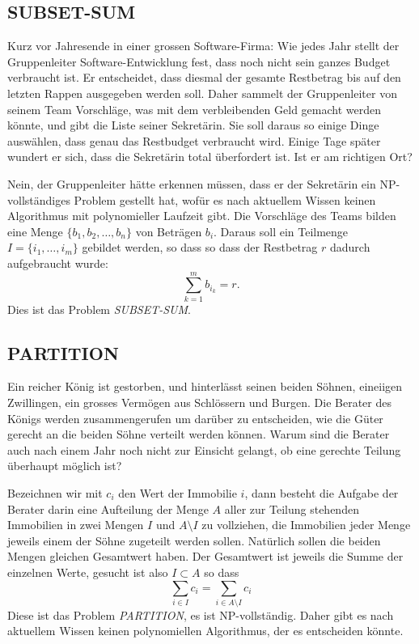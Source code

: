 \subsection{SUBSET-SUM}
Kurz vor Jahresende in einer grossen Software-Firma: Wie jedes Jahr stellt
der Gruppenleiter Software-Entwicklung fest, dass noch nicht sein ganzes
Budget verbraucht ist.  Er entscheidet, dass diesmal der gesamte Restbetrag
bis auf den letzten Rappen
ausgegeben werden soll.  Daher sammelt der Gruppenleiter von seinem
Team Vorschläge, was mit dem verbleibenden Geld gemacht werden könnte,
und gibt die Liste seiner Sekretärin.  Sie soll daraus so einige Dinge
auswählen, dass genau das Restbudget verbraucht wird. Einige Tage später
wundert er sich, dass die Sekretärin total überfordert ist. Ist er
am richtigen Ort?

\medskip

Nein, der Gruppenleiter hätte erkennen müssen, dass er der Sekretärin
ein NP-vollständiges Problem gestellt hat, wofür es nach aktuellem
Wissen keinen Algorithmus mit polynomieller Laufzeit gibt. Die Vorschläge
des Teams bilden eine Menge $\{b_1,b_2,\dots,b_n\}$ von Beträgen $b_i$.
Daraus soll ein Teilmenge $I=\{i_1,\dots,i_m\}$ gebildet werden, so dass
so dass der Restbetrag $r$ dadurch aufgebraucht wurde:
\[
\sum_{k=1}^m b_{i_k} = r.
\]
Dies ist das Problem {\it SUBSET-SUM}.

\subsection{PARTITION}
Ein reicher König ist gestorben, und hinterlässt seinen beiden
Söhnen, eineiigen Zwillingen, ein grosses Vermögen aus Schlössern
und Burgen. Die Berater des Königs werden zusammengerufen um
darüber zu entscheiden, wie die Güter gerecht an die beiden Söhne
verteilt werden können. Warum sind die Berater auch nach einem Jahr
noch nicht zur Einsicht gelangt, ob eine gerechte Teilung überhaupt
möglich ist?

Bezeichnen wir mit $c_i$ den Wert der Immobilie $i$, dann besteht
die Aufgabe der Berater darin eine Aufteilung der Menge $A$ aller 
zur Teilung stehenden Immobilien in zwei Mengen $I$ und $A\setminus I$
zu vollziehen, die Immobilien jeder Menge jeweils einem der Söhne zugeteilt
werden sollen.
Natürlich sollen die beiden Mengen gleichen Gesamtwert haben.
Der Gesamtwert ist jeweils die Summe der einzelnen Werte, gesucht ist also
$I\subset A$ so dass
\[
\sum_{i\in I}c_i =\sum_{i\in A\setminus I}c_i
\]
Diese ist das Problem {\it PARTITION}, es ist NP-vollständig.
Daher gibt es nach aktuellem Wissen keinen polynomiellen Algorithmus,
der es entscheiden könnte.


